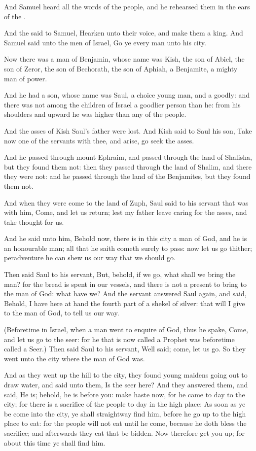 \Verse And Samuel heard all the words of the people, and he rehearsed them in the ears of the \LORD.

\Verse And the \LORD said to Samuel, Hearken unto their voice, and make them a king. And Samuel said unto the men of Israel, Go ye every man unto his city.


\Chapter
\Verse Now there was a man of Benjamin, whose name was Kish, the son of Abiel, the son of Zeror, the son of Bechorath, the son of Aphiah, a Benjamite, a mighty man of power.

\Verse And he had a son, whose name was Saul, a choice young man, and a goodly: and there was not among the children of Israel a goodlier person than he: from his shoulders and upward he was higher than any of the people.

\Verse And the asses of Kish Saul's father were lost. And Kish said to Saul his son, Take now one of the servants with thee, and arise, go seek the asses.

\Verse And he passed through mount Ephraim, and passed through the land of Shalisha, but they found them not: then they passed through the land of Shalim, and there they were not: and he passed through the land of the Benjamites, but they found them not.

\Verse And when they were come to the land of Zuph, Saul said to his servant that was with him, Come, and let us return; lest my father leave caring for the asses, and take thought for us.

\Verse And he said unto him, Behold now, there is in this city a man of God, and he is an honourable man; all that he saith cometh surely to pass: now let us go thither; peradventure he can shew us our way that we should go.

\Verse Then said Saul to his servant, But, behold, if we go, what shall we bring the man? for the bread is spent in our vessels, and there is not a present to bring to the man of God: what have we?  \Verse And the servant answered Saul again, and said, Behold, I have here at hand the fourth part of a shekel of silver: that will I give to the man of God, to tell us our way.

\Verse (Beforetime in Israel, when a man went to enquire of God, thus he spake, Come, and let us go to the seer: for he that is now called a Prophet was beforetime called a Seer.)  \Verse Then said Saul to his servant, Well said; come, let us go. So they went unto the city where the man of God was.

\Verse And as they went up the hill to the city, they found young maidens going out to draw water, and said unto them, Is the seer here?  \Verse And they answered them, and said, He is; behold, he is before you: make haste now, for he came to day to the city; for there is a sacrifice of the people to day in the high place: \Verse As soon as ye be come into the city, ye shall straightway find him, before he go up to the high place to eat: for the people will not eat until he come, because he doth bless the sacrifice; and afterwards they eat that be bidden. Now therefore get you up; for about this time ye shall find him.

